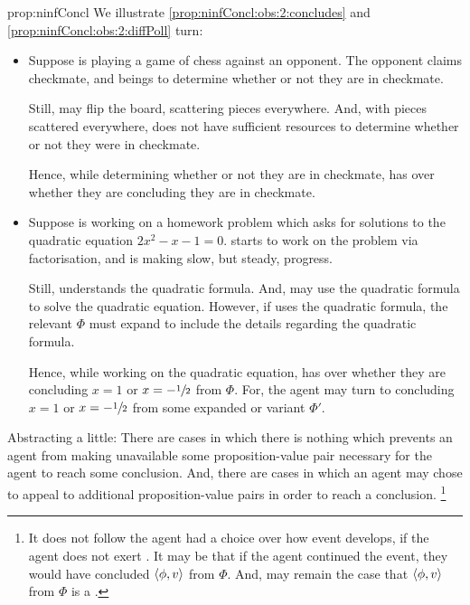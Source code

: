 \begin{note}
\begin{argument}{prop:ninfConcl}
    \noindent%
    We illustrate \ref{prop:ninfConcl:obs:2:concludes} and \ref{prop:ninfConcl:obs:2:diffPoll} turn:

    \begin{itemize}
    \item
      Suppose \vAgent{} is playing a game of chess against an opponent.
      The opponent claims checkmate, and \vAgent{} beings to determine whether or not they are in checkmate.

      Still, \vAgent{} may flip the board, scattering pieces everywhere.
      And, with pieces scattered everywhere, \vAgent{} does not have sufficient resources to determine whether or not they were in checkmate.

      Hence, while determining whether or not they are in checkmate, \vAgent{} has \ninf{} over whether they are concluding they are in checkmate.
    \end{itemize}

    \begin{itemize}
    \item
      Suppose \vAgent{} is working on a homework problem which asks for solutions to the quadratic equation \(2x^{2} - x - 1 = 0\).
      \vAgent{} starts to work on the problem via factorisation, and is making slow, but steady, progress.

      Still, \vAgent{} understands the quadratic formula.
      And, \vAgent{} may use the quadratic formula to solve the quadratic equation.
      However, if \vAgent{} uses the quadratic formula, the relevant \pool{} \(\Phi\) must expand to include the details regarding the quadratic formula.

      Hence, while working on the quadratic equation, \vAgent{} has \ninf{} over whether they are concluding \(x = 1\) or \(x = -\sfrac{1}{2}\) from \(\Phi\).
      For, the agent may turn to concluding \(x = 1\) or \(x = -\sfrac{1}{2}\) from some expanded or variant \pool{} \(\Phi'\).
    \end{itemize}

    Abstracting a little:
    There are cases in which there is nothing which prevents an agent from making unavailable some proposition-value pair necessary for the agent to reach some conclusion.
    And, there are cases in which an agent may chose to appeal to additional proposition-value pairs in order to reach a conclusion.%
    \footnote{
      It does not follow the agent had a choice over how event develops, if the agent does not exert \ninf{}.
      It may be that if the agent continued the event, they would have concluded \(\langle \phi, v \rangle\) from \(\Phi\).
      And, may remain the case that \(\langle \phi, v \rangle\) from \(\Phi\) is a \fc{}.
    }
  \end{argument}
\end{note}

